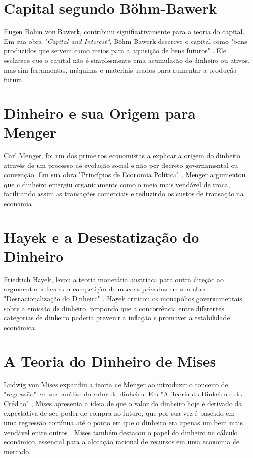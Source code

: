 \section*{Capital segundo Böhm-Bawerk}
Eugen Böhm von Bawerk, contribuiu significativamente para a teoria do capital. Em sua obra \textit{"Capital and Interest"}\cite{bohm1884capital}, Böhm-Bawerk descreve o capital como "bens produzidos que servem como meios para a aquisição de bens futuros" \cite{bohm1884capital}. Ele esclarece que o capital não é simplesmente uma acumulação de dinheiro ou ativos, mas sim ferramentas, máquinas e materiais usados para aumentar a produção futura.

\section*{Dinheiro e sua Origem para Menger}
Carl Menger, foi um dos primeiros economistas a explicar a origem do dinheiro através de um processo de evolução social e não por decreto governamental ou convenção. Em sua obra "Princípios de Economia Política" \cite{menger2017liberalismo}, Menger argumentou que o dinheiro emergiu organicamente como o meio mais vendável de troca, facilitando assim as transações comerciais e reduzindo os custos de transação na economia \cite{menger1871principles}.

\section*{Hayek e a Desestatização do Dinheiro}
Friedrich Hayek, levou a teoria monetária austríaca para outra direção ao argumentar a favor da competição de moedas privadas em sua obra "Desnacionalização do Dinheiro" \cite{hayek2017desestatizaccao}. Hayek criticou os monopólios governamentais sobre a emissão de dinheiro, propondo que a concorrência entre diferentes categorias de dinheiro poderia prevenir a inflação e promover a estabilidade econômica.

\section*{A Teoria do Dinheiro de Mises}
Ludwig von Mises expandiu a teoria de Menger ao introduzir o conceito de "regressão" em sua análise do valor do dinheiro. Em "A Teoria do Dinheiro e do Crédito" \cite{von2013theory}, Mises apresenta a ideia de que o valor do dinheiro hoje é derivado da expectativa de seu poder de compra no futuro, que por sua vez é baseado em uma regressão contínua até o ponto em que o dinheiro era apenas um bem mais vendável entre outros \cite{von2013theory}. Mises também destacou o papel do dinheiro no cálculo econômico, essencial para a alocação racional de recursos em uma economia de mercado.

